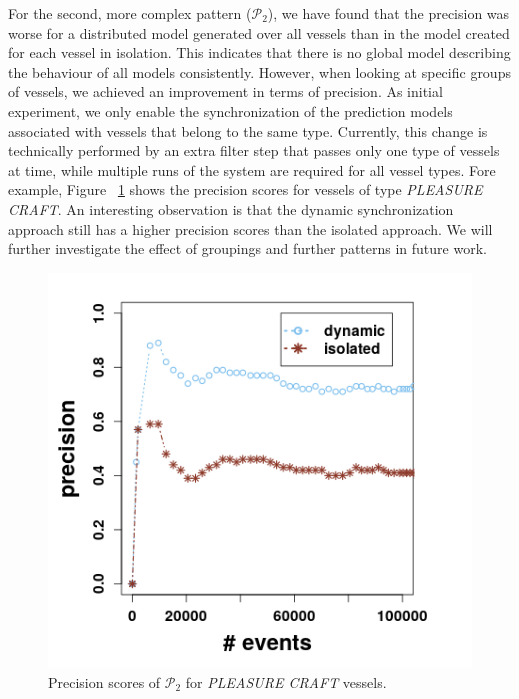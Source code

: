 For the second, more complex pattern ($\mathcal{P}_2$), we have found that the precision was worse for a distributed model generated over all vessels than in the model created for each vessel in isolation. This indicates that there is no  global model describing the behaviour of all models consistently. However, when looking at specific groups of vessels, we achieved an improvement in terms of precision. As initial experiment, we only enable the synchronization of the prediction models associated with vessels that belong to the same type. Currently, this change is technically performed by an extra filter step that passes only one type of vessels at time, while multiple runs of the system are required for all vessel types. Fore example, Figure ~\ref{fig:precsions_p2} shows the precision scores for vessels of type \textit{PLEASURE CRAFT}. An interesting observation is that the dynamic synchronization approach still has  a higher precision scores than the isolated approach. We will further investigate the effect of groupings and further patterns in future work.


 \begin{figure}[h]
	
	\includegraphics[width=.5\textwidth]{figures/precision_p2.png}
	
	\caption{Precision scores of $\mathcal{P}_2$  for \textit{PLEASURE CRAFT} vessels.}
	\label{fig:precsions_p2}
\end{figure}





























